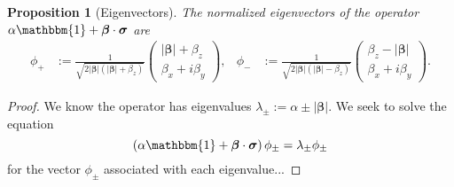 \documentclass[12pt]{article}
\newtheorem{prop}[thm]{Proposition}
\begin{document}
\begin{prop}[Eigenvectors]
  The normalized eigenvectors of the operator $\alpha \mathbbm{1} + \bm{\beta} \cdot
  \bm{\sigma}$ are
  \begin{align*}
    \phi_{+}
    &:= \frac{1}{\sqrt{2|\bm{\beta}| (|\bm{\beta}|+\beta_z)}}
    \begin{pmatrix}
      |\bm{\beta}|+\beta_z \\
      \beta_x+i\beta_y
    \end{pmatrix},
    &
    \phi_{-}
    &:= \frac{1}{\sqrt{2|\bm{\beta}|(|\bm{\beta}|-\beta_z)}}
    \begin{pmatrix}
      \beta_z - |\bm{\beta}|\\
      \beta_x+i\beta_y
    \end{pmatrix}.
  \end{align*}
\end{prop}

\begin{proof}
  We know the operator has eigenvalues $\lambda_{\pm} := \alpha \pm
  |\bm{\beta}|$.  We seek to solve the equation
  \begin{displaymath}
    \left( \alpha \mathbbm{1} + \bm{\beta} \cdot
  \bm{\sigma} \right) \phi_{\pm} = \lambda_{\pm} \phi_{\pm}
  \end{displaymath}
  for the vector $\phi_{\pm}$ associated with each eigenvalue...
\end{proof}


\bigskip
\end{document}
